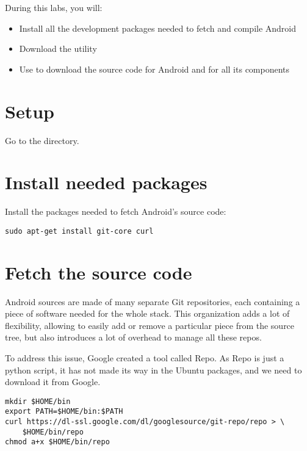 
During this labs, you will:
\begin{itemize}
  \item Install all the development packages needed to fetch and compile Android
  \item Download the  utility
  \item Use  to download the source code for Android
        and for all its components 
\end{itemize}

\section{Setup}

Go to the  directory.

\section{Install needed packages}

Install the packages needed to fetch Android's source code:

\begin{verbatim}
sudo apt-get install git-core curl
\end{verbatim}

\section{Fetch the source code}

Android sources are made of many separate Git repositories, each
containing a piece of software needed for the whole stack. This
organization adds a lot of flexibility, allowing to easily add or
remove a particular piece from the source tree, but also introduces a
lot of overhead to manage all these repos.

To address this issue, Google created a tool called Repo. As Repo is
just a python script, it has not made its way in the Ubuntu packages,
and we need to download it from Google.

\begin{verbatim}
mkdir $HOME/bin
export PATH=$HOME/bin:$PATH
curl https://dl-ssl.google.com/dl/googlesource/git-repo/repo > \
    $HOME/bin/repo
chmod a+x $HOME/bin/repo
\end{verbatim}

